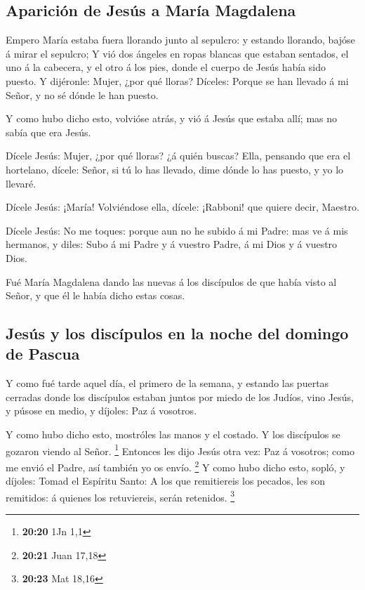 \hypertarget{apariciuxf3n-de-jesuxfas-a-maruxeda-magdalena}{%
\subsection{Aparición de Jesús a María
Magdalena}\label{apariciuxf3n-de-jesuxfas-a-maruxeda-magdalena}}

 Empero María estaba fuera llorando junto al sepulcro: y
estando llorando, bajóse á mirar el sepulcro;  Y vió dos
ángeles en ropas blancas que estaban sentados, el uno á la cabecera, y
el otro á los pies, donde el cuerpo de Jesús había sido puesto.
 Y dijéronle: Mujer, ¿por qué lloras? Díceles: Porque se
han llevado á mi Señor, y no sé dónde le han puesto.

 Y como hubo dicho esto, volvióse atrás, y vió á Jesús
que estaba allí; mas no sabía que era Jesús.

 Dícele Jesús: Mujer, ¿por qué lloras? ¿á quién buscas?
Ella, pensando que era el hortelano, dícele: Señor, si tú lo has
llevado, dime dónde lo has puesto, y yo lo llevaré.

 Dícele Jesús: ¡María! Volviéndose ella, dícele:
¡Rabboni! que quiere decir, Maestro.

 Dícele Jesús: No me toques: porque aun no he subido á mi
Padre: mas ve á mis hermanos, y diles: Subo á mi Padre y á vuestro
Padre, á mi Dios y á vuestro Dios.

 Fué María Magdalena dando las nuevas á los discípulos de
que había visto al Señor, y que él le había dicho estas cosas.

\hypertarget{jesuxfas-y-los-discuxedpulos-en-la-noche-del-domingo-de-pascua}{%
\subsection{Jesús y los discípulos en la noche del domingo de
Pascua}\label{jesuxfas-y-los-discuxedpulos-en-la-noche-del-domingo-de-pascua}}

 Y como fué tarde aquel día, el primero de la semana, y
estando las puertas cerradas donde los discípulos estaban juntos por
miedo de los Judíos, vino Jesús, y púsose en medio, y díjoles: Paz á
vosotros.

 Y como hubo dicho esto, mostróles las manos y el
costado. Y los discípulos se gozaron viendo al Señor. \footnote{\textbf{20:20}
  1Jn 1,1}  Entonces les dijo Jesús otra vez: Paz á
vosotros; como me envió el Padre, así también yo os envío. \footnote{\textbf{20:21}
  Juan 17,18}  Y como hubo dicho esto, sopló, y díjoles:
Tomad el Espíritu Santo:  A los que remitiereis los
pecados, les son remitidos: á quienes los retuviereis, serán retenidos.
\footnote{\textbf{20:23} Mat 18,16}

